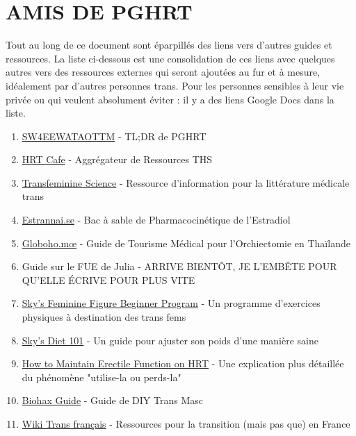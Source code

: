 \documentclass{article}
\begin{document}
\section*{AMIS DE PGHRT}\label{FOPGHRT}

Tout au long de ce document sont éparpillés des liens vers d'autres guides et ressources. La liste ci-dessous est une consolidation de ces liens avec quelques autres vers des ressources externes qui seront ajoutées au fur et à mesure, idéalement par d'autres personnes trans. Pour les personnes sensibles à leur vie privée ou qui veulent absolument éviter : il y a des liens Google Docs dans la liste.

\begin{enumerate}
  \item \href{https://startwith4mgestradiolenanthateweeklyandtestatonetothreemonths.com/}{SW4EEWATAOTTM} - TL;DR de PGHRT
  \item \href{https://web.archive.org/web/20260310142419/https://hrtcafe.net/}{HRT Cafe} - Aggrégateur de Ressources THS
  \item \href{https://transfemscience.org/}{Transfeminine Science} - Ressource d'information pour la littérature médicale trans
  \item \href{https://estrannai.se}{Estrannai.se} - Bac à sable de Pharmacocinétique de l'Estradiol
  \item \href{https://globoho.mœ/}{Globoho.mœ} - Guide de Tourisme Médical pour l'Orchiectomie en Thaïlande
  \item Guide sur le FUE de Julia - ARRIVE BIENTÔT, JE L'EMBÊTE POUR QU'ELLE ÉCRIVE POUR PLUS VITE
  \item \href{https://docs.google.com/document/d/1-NyE5EY5TTaRRMhk7HlTbKJ7HifjEsA4jlDO1qKQVl0/edit?tab=t.0}{Sky's Feminine Figure Beginner Program} - Un programme d'exercices physiques à destination des trans fems
  \item \href{https://docs.google.com/document/d/114sztSw1aVWM2pXLDl9NrHklyvewz3EmFiHiisjM71k/edit?tab=t.0}{Sky's Diet 101} - Un guide pour ajuster son poids d'une manière saine
  \item \href{https://stainedglasswoman.substack.com/p/how-to-maintain-your-penis-function}{How to Maintain Erectile Function on HRT} - Une explication plus détaillée du phénomène "utilise-la ou perds-la"
  \item \href{https://mega.nz/folder/cfwSmBbY#ify6kaueB8SdDD1v12t2Dw}{Biohax Guide} - Guide de DIY Trans Masc
  \item \href{https://wikitrans.co/}{Wiki Trans français} - Ressources pour la transition (mais pas que) en France
\end{enumerate}
\end{document}
